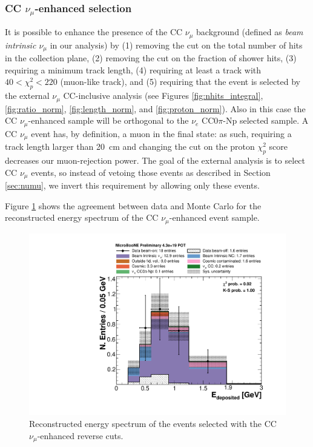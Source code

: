 \subsubsection{CC \texorpdfstring{$\nu_{\mu}$}{numu}-enhanced selection}
It is possible to enhance the presence of the CC $\nu_{\mu}$ background (defined as \emph{beam intrinsic $\nu_{\mu}$} in our analysis) by (1) removing the cut on the total number of hits in the collection plane, (2) removing the cut on the fraction of shower hits, (3) requiring a minimum track length, (4) requiring at least a track with $40 < \chi_p^{2} < 220$ (muon-like track), and (5) requiring that the event is selected by the external $\nu_{\mu}$ CC-inclusive analysis \cite{ubxsec} (see Figures \ref{fig:nhits_integral}, \ref{fig:ratio_norm}, \ref{fig:length_norm}, and \ref{fig:proton_norm}). Also in this case the CC $\nu_{\mu}$-enhanced sample will be orthogonal to the $\nu_{e}$ CC0$\pi$-Np selected sample.
A CC $\nu_{\mu}$ event has, by definition, a muon in the final state: as such, requiring a track length larger than 20~cm and changing the cut on the proton $\chi^2_p$ score decreases our muon-rejection power. The goal of the external analysis is to select CC $\nu_{\mu}$ events, so instead of vetoing those events as described in Section \ref{sec:numu}, we invert this requirement by allowing only these events.

Figure \ref{fig:numu_inverted} shows the agreement between data and Monte Carlo for the reconstructed energy spectrum of the CC $\nu_{\mu}$-enhanced event sample.

\begin{figure}[htbp]
\centering
  \includegraphics[width=0.7\linewidth]{figures/numu_reco.pdf}
  \caption{Reconstructed energy spectrum of the events selected with the CC~$\nu_{\mu}$-enhanced reverse cuts.}\label{fig:numu_inverted}
\end{figure}

